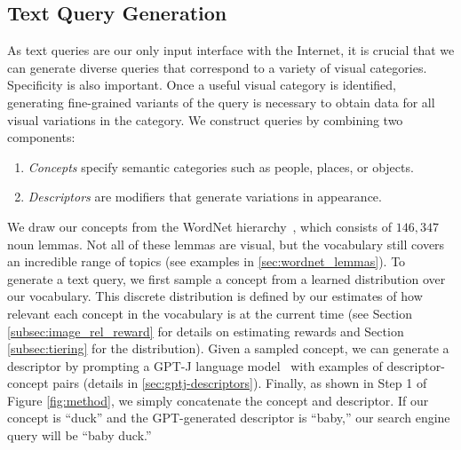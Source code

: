 \subsection{Text Query Generation}
\label{subsec:text_query_generation}
As text queries are our only input interface with the Internet, it is crucial that we can generate diverse queries that correspond to a variety of visual categories. Specificity is also important. Once a useful visual category is identified, generating fine-grained variants of the query is necessary to obtain data for all visual variations in the category.
We construct queries by combining two components: 
\begin{enumerate}[noitemsep,topsep=0pt]
    \item \textit{Concepts} specify semantic categories such as people, places, or objects. %
    \item \textit{Descriptors} are modifiers that generate variations in appearance. %
\end{enumerate}

We draw our concepts from the WordNet hierarchy~\cite{miller1995wordnet}, which consists of $146{,}347$ noun lemmas. Not all of these lemmas are visual, but the vocabulary still covers an incredible range of topics (see examples in \cref{sec:wordnet_lemmas}).
To generate a text query, we first sample a concept from a learned distribution over our vocabulary. This discrete distribution is defined by our estimates of how relevant each concept in the vocabulary is at the current time (see Section \ref{subsec:image_rel_reward} for details on estimating rewards and Section \ref{subsec:tiering} for the distribution).
Given a sampled concept, we can generate a descriptor by prompting a GPT-J language model~\cite{gpt-j} with examples of descriptor-concept pairs (details in \cref{sec:gptj-descriptors}).
Finally, as shown in Step 1 of Figure \ref{fig:method}, we simply concatenate the concept and descriptor. If our concept is ``duck'' and the GPT-generated descriptor is ``baby,'' our search engine query will be ``baby duck.''


